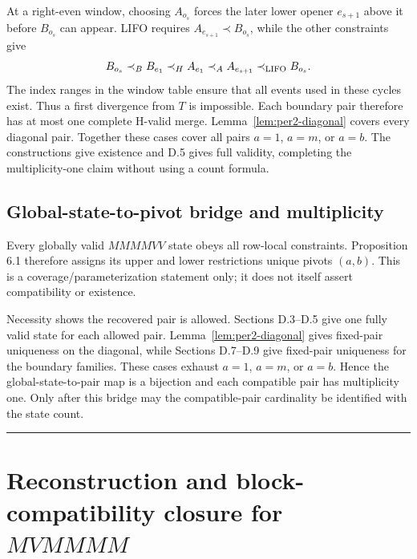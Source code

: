\documentclass[11pt]{article}
\theoremstyle{definition}
\theoremstyle{remark}
\begin{document}
At a right-even window, choosing $A_{o_s}$ forces the later lower opener
$e_{s+1}$ above it before $B_{o_s}$ can appear. LIFO requires
$A_{e_{s+1}}\prec B_{o_s}$, while the other constraints give
\[
 B_{o_s}
 \mathrel{\prec_B} B_{e_1}
 \mathrel{\prec_H} A_{e_1}
 \mathrel{\prec_A} A_{e_{s+1}}
 \mathrel{\prec_{\rm LIFO}} B_{o_s}.
\]
The index ranges in the window table ensure that all events used in
these cycles exist. Thus a first divergence from $T$ is impossible.
Each boundary pair therefore has at most one complete H-valid merge.
Lemma~\ref{lem:per2-diagonal} covers every diagonal pair. Together these
cases cover all pairs $a=1$, $a=m$, or $a=b$. The constructions give
existence and D.5 gives full validity, completing the multiplicity-one
claim without using a count formula.

\subsection{Global-state-to-pivot bridge and
multiplicity}\label{d.10.-global-state-to-pivot-bridge-and-multiplicity}

Every globally valid \(MMMMVV\) state obeys all row-local constraints.
Proposition 6.1 therefore assigns its upper and lower restrictions
unique pivots \((a,b)\). This is a coverage/parameterization statement
only; it does not itself assert compatibility or existence.

Necessity shows the recovered pair is allowed. Sections D.3--D.5 give
one fully valid state for each allowed pair. Lemma~\ref{lem:per2-diagonal}
gives fixed-pair uniqueness on the diagonal, while Sections D.7--D.9
give fixed-pair uniqueness for the boundary families. These cases exhaust
$a=1$, $a=m$, or $a=b$. Hence the global-state-to-pair map is a
bijection and each compatible pair has multiplicity one. Only after this bridge may the compatible-pair
cardinality be identified with the state count.

\begin{center}\rule{0.5\linewidth}{0.5pt}\end{center}

\section{\texorpdfstring{Reconstruction and
block-compatibility closure for
\(MVMMMM\)}{Reconstruction and block-compatibility closure for MVMMMM}}\label{appendix-e.-reconstruction-and-block-compatibility-closure-for-mvmmmm}
\end{document}
